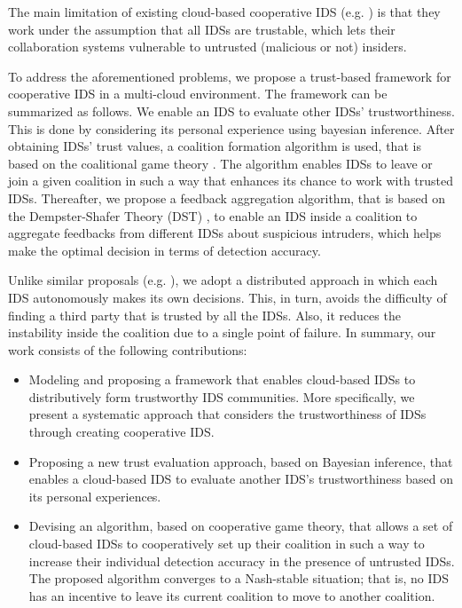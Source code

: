 \documentclass[conference]{IEEEtran}
\begin{document}
The main limitation of existing cloud-based cooperative IDS (e.g.  \cite{man2012collaborative} \cite{singh2016collaborative} \cite{ghribi2016distributed} \cite{chiba2016cooperative} \cite{al2015cl} \cite{kholidy2012cids}) is that they work under the assumption that all IDSs are trustable, which lets their collaboration systems vulnerable to untrusted (malicious or not) insiders.%

To address the aforementioned problems, we propose a trust-based framework for cooperative IDS in a multi-cloud environment. The framework can be summarized as follows. We enable an IDS to evaluate other IDSs' trustworthiness. This is done by considering its personal experience using bayesian inference. After obtaining IDSs' trust values, a coalition formation algorithm is used, that is based on the coalitional game theory \cite{ray2007game}. The algorithm enables IDSs to leave or join a given coalition in such a way that enhances its chance to work with trusted IDSs. Thereafter, we propose a feedback aggregation algorithm, that is based on the Dempster-Shafer Theory (DST) \cite{shafer1992dempster}, to enable an IDS inside a coalition to aggregate feedbacks from different IDSs about suspicious intruders, which helps make the optimal decision in terms of detection accuracy.

Unlike similar proposals (e.g. \cite{dermott2015collaborative}), we adopt a distributed
approach in which each IDS autonomously makes its own decisions. This, in turn, avoids the difficulty of finding a third party that is trusted by all the IDSs. Also, it reduces the instability inside the coalition due to a single point of failure. In summary, our work consists of the following contributions:

\begin{itemize}

\item  Modeling and proposing a framework that enables cloud-based IDSs to distributively form trustworthy IDS communities. More specifically, we present a systematic approach that considers the trustworthiness of IDSs through creating cooperative IDS.

\item Proposing a new trust evaluation approach, based on Bayesian inference, that enables a cloud-based IDS to evaluate another IDS's trustworthiness based on its personal experiences.

\item Devising an algorithm, based on cooperative game theory, that allows a set of cloud-based IDSs to cooperatively set up their coalition in such a way to increase their individual detection accuracy in the presence of untrusted IDSs. The proposed algorithm converges to a Nash-stable situation; that is, no IDS has an incentive to leave its current coalition to move to another coalition.
\end{itemize}
\end{document}
